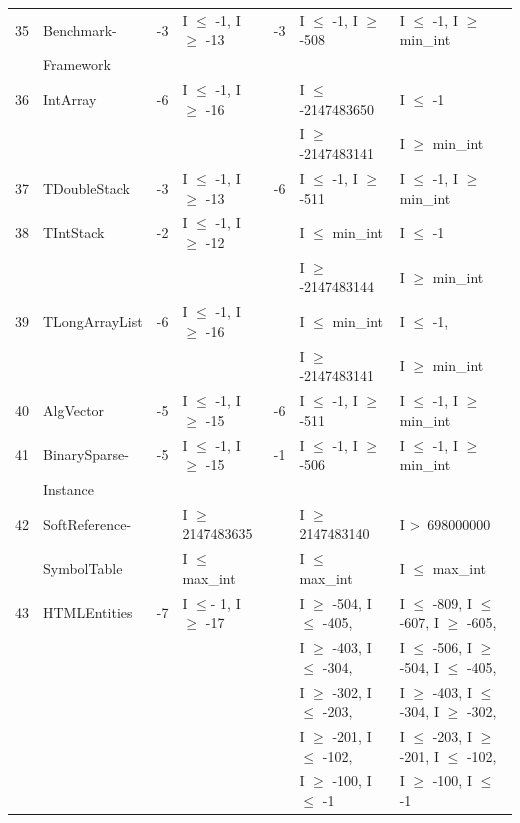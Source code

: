 {\begin{longtable}{|l|l|l|l|l|l|l|}
	\hline
35	& Benchmark-				&-3 & I $\le$ -1, I $\ge$ -13		&-3 & I $\le$ -1, I $\ge$ -508			& I $\le$ -1, I $\ge$ min\_int	\\ 
	&Framework					&&								&&								&						\\
	\hline
36	& IntArray					&-6 & I $\le$ -1, I $\ge$ -16		&& I $\le$ -2147483650			& I $\le$ -1								\\ 
	&							&&								&& I $\ge$ -2147483141			& I $\ge$ min\_int				\\
	\hline
37	& TDoubleStack				&-3 & I $\le$ -1, I $\ge$ -13		&-6 & I $\le$ -1, I $\ge$ -511			& I $\le$ -1, I $\ge$ min\_int	\\ 
	\hline
38	& TIntStack					&-2 & I $\le$ -1, I $\ge$ -12		&	& I $\le$ min\_int				& I $\le$ -1 							\\ 
	&							&&								&& I $\ge$ -2147483144			& I $\ge$ min\_int				\\
	\hline
39	& TLongArrayList				&-6 & I $\le$ -1, I $\ge$ -16		&	& I $\le$ min\_int 				& I $\le$ -1, 							\\ 
	&							&&								&& I $\ge$ -2147483141			& I $\ge$ min\_int				\\
	\hline
40	& AlgVector					&-5 & I $\le$ -1, I $\ge$ -15		&-6 & I $\le$ -1, I $\ge$ -511			& I $\le$ -1, I $\ge$ min\_int	\\ 
	\hline
41	& BinarySparse-				&-5 & I $\le$ -1, I $\ge$ -15		&-1 & I $\le$ -1, I $\ge$ -506			& I $\le$ -1, I $\ge$ min\_int	\\ 
	& Instance					&&								&&								&				\\
	\hline
42	& SoftReference-				&& I $\ge$ 2147483635			&& I $\ge$ 2147483140			& I \textgreater~698000000					\\ 
	& SymbolTable                         && I $\le$ max\_int				&& I $\le$ max\_int					& I $\le$ max\_int			\\
	\hline
43	& HTMLEntities				&-7 & I $\le$- 1, I $\ge$ -17		&& I $\ge$ -504, I $\le$ -405,		& I $\le$ -809, I $\le$ -607, I $\ge$ -605,    		\\ 
	&                         			&& 								&& I $\ge$ -403, I $\le$ -304, 		& I $\le$ -506, I $\ge$ -504, I $\le$ -405,		 \\	
	&                         			&& 								&& I $\ge$ -302, I $\le$ -203,		& I $\ge$ -403, I $\le$ -304, I $\ge$ -302,		 \\	
	&                        				&& 								&& I $\ge$ -201, I $\le$ -102, 		& I $\le$ -203, I $\ge$ -201, I $\le$ -102,		 \\	
	&                         			&& 								&& I $\ge$ -100, I $\le$ -1			& I $\ge$ -100, I $\le$ -1				 			 \\	

\end{longtable}}
